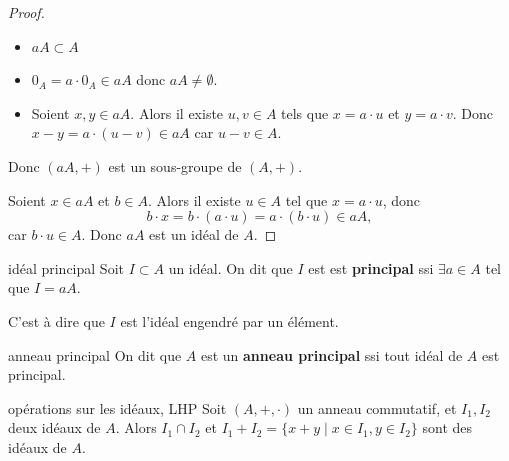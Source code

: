 \begin{proof}
    \begin{itemize}
        \item $aA \subset A$ 
        \item $0_A = a \cdot 0_A \in aA$ donc $aA \neq \emptyset$.
        \item Soient $x, y \in aA$. Alors il existe $u, v \in A$ tels que $x = a \cdot u$ et $y = a \cdot v$.
        Donc $x - y = a \cdot (u - v) \in aA$ car $u - v \in A$.

    \end{itemize}

    Donc $(aA, +)$ est un sous-groupe de $(A, +)$.

    Soient $x \in aA$ et $b \in A$. Alors il existe $u \in A$ tel que $x = a \cdot u$, donc 
    \[
        b \cdot x = b \cdot (a \cdot u) = a \cdot (b \cdot u) \in aA,   
    \]
    car $b \cdot u \in A$.
    Donc $aA$ est un idéal de $A$.
\end{proof}

\begin{definition}{idéal principal}{}
    Soit $I \subset A$ un idéal. On dit que $I$ est 
    est \textbf{principal} ssi $\exists a \in A$ tel que $I = aA$.

    C'est à dire que $I$ est l'idéal engendré par un élément.
\end{definition}

\begin{definition}{anneau principal}{}
    On dit que $A$ est un \textbf{anneau principal} ssi tout
    idéal de $A$ est principal.
\end{definition}

\begin{proposition}{opérations sur les idéaux, LHP}{}
    Soit $(A, +, \cdot)$ un anneau commutatif, et $I_1, I_2$ deux idéaux de $A$. Alors 
    $I_1 \cap I_2$ et $I_1 + I_2 = \{x + y \mid x \in I_1, y \in I_2\}$ sont des idéaux de $A$.
\end{proposition}

